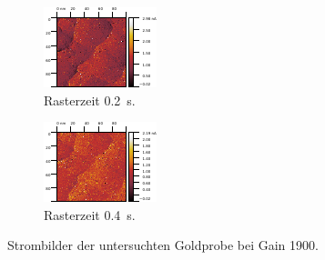\begin{figure}[H]
	\begin{subfigure}{0.49\textwidth}
		\centering
\includegraphics[width=\textwidth]{../Gwyddion/Gold/TIME_02_I_forward.pdf}
\caption{Rasterzeit \SI{0.2}{s}.}

	\end{subfigure}
	\begin{subfigure}{0.49\textwidth}
		\centering
\includegraphics[width=\textwidth]{../Gwyddion/Gold/TIME_04_I_forward.pdf}
\caption{ Rasterzeit \SI{0.4}{s}.}

	\end{subfigure}
	
	\caption{Strombilder der untersuchten Goldprobe bei Gain 1900.}
	\label{GAIN_slow_I}
\end{figure}



